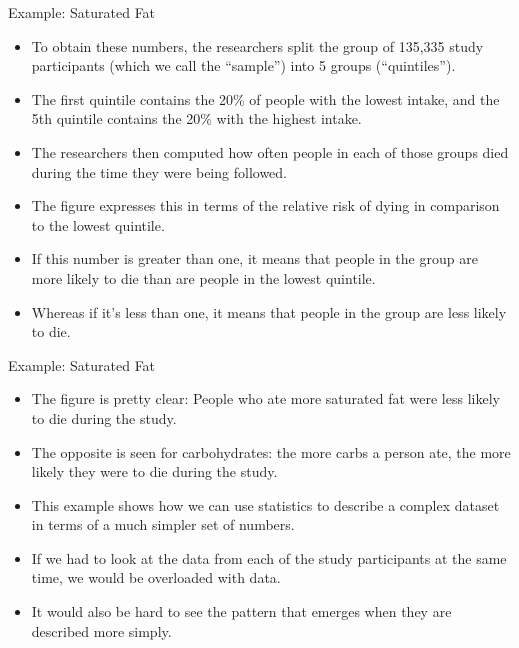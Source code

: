\documentclass[handout]{beamer}
\begin{document}
\begin{frame}{Example: Saturated Fat}

\scriptsize{
\begin{itemize}
\item To obtain these numbers, the researchers split the group of 135,335 study participants (which we call the ``sample'') into 5 groups (“quintiles”).
\item The first quintile contains the 20\% of people with the lowest intake, and the 5th quintile contains the 20\% with the highest intake. 
\item The researchers then computed how often people in each of those groups died during the time they were being followed. 
\item The figure expresses this in terms of the relative risk of dying in comparison to the lowest quintile.
\item If this number is greater than one, it means that people in the group are more likely to die than are people in the lowest quintile.
\item Whereas if it’s less than one, it means that people in the group are less likely to die. 
\end{itemize}

}
 
\end{frame}


\begin{frame}{Example: Saturated Fat}

\scriptsize{
\begin{itemize}
\item The figure is pretty clear: People who ate more saturated fat were less likely to die during the study.
\item The opposite is seen for carbohydrates: the more carbs a person ate, the more likely they were to die during the study. \item This example shows how we can use statistics to describe a complex dataset in terms of a much simpler set of numbers.
\item If we had to look at the data from each of the study participants at the same time, we would be overloaded with data. 
\item It would also be hard to see the pattern that emerges when they are described more simply.

\end{itemize}

}
 
\end{frame}
\end{document}
